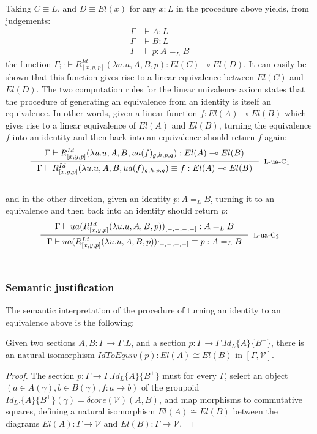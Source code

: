     Taking $C \equiv L$, and $D \equiv El(x)$ for any $x : L$ in the procedure above yields, from judgements:
    \[
      \begin{split}
        \Gamma &\vdash A : L\\
        \Gamma &\vdash B : L\\
        \Gamma &\vdash p : A =_L B
      \end{split}
    \]
    the function $\Gamma; \cdot \vdash R^{Id}_{[x, y, p]}(\lambda u.u, A, B, p) : El(C) \multimap El(D)$.
    It can easily be shown that this function gives rise to a linear equivalence between $El(C)$ and $El(D)$.
    The two computation rules for the linear univalence axiom states that the procedure of generating an equivalence from an identity is itself an equivalence. In other words, given a linear function $f : El(A) \multimap El(B)$ which gives rise to a linear equivalence of $El(A)$ and $El(B)$, turning the equivalence $f$ into an identity and then back into an equivalence should return $f$ again:
  \[
    \inference{
      \Gamma \vdash R^{Id}_{[x, y, p]}(\lambda u.u, A, B, ua(f)_{g, h, p, q}) : El(A) \multimap El(B)}
    {\Gamma \vdash R^{Id}_{[x, y, p]}(\lambda u.u, A, B, ua(f)_{g, h, p, q}) \equiv f : El(A) \multimap El(B)}
    [L-ua-C$_1$]
  \]\\
  and in the other direction, given an identity $p : A =_L B$, turning it to an equivalence and then back into an identity should return $p$:
    \[
    \inference{
      \Gamma \vdash ua(R^{Id}_{[x, y, p]}(\lambda u.u, A, B, p))_{[-,-,-,-]} : A =_L B}
    {\Gamma \vdash ua(R^{Id}_{[x, y, p]}(\lambda u.u, A, B, p))_{[-,-,-,-]} \equiv p : A =_L B}
    [L-ua-C$_2$]
  \]\\
  \subsubsection{Semantic justification}
  The semantic interpretation of the procedure of turning an identity to an equivalence above is the following:
  \begin{lemm}Given two sections $A, B : \Gamma \to \Gamma.L$, and a section $p : \Gamma \to \Gamma.Id_L\{A\}\{B^+\}$, there is an natural isomorphism $IdToEquiv(p) : El(A) \cong El(B)$ in $[\Gamma, \mathcal{V}]$.
    \begin{proof}The section $p : \Gamma \to \Gamma.Id_L\{A\}\{B^+\}$ must for every $\Gamma$, select an object $(a \in A(\gamma), b \in B(\gamma), f : a \to b)$ of the groupoid $Id_L.\{A\}\{B^+\}(\gamma) = \delta core(\mathcal{V})(A,B)$, and map morphisms to commutative squares, defining a natural isomorphism $El(A) \cong El(B)$ between the diagrams $El(A) : \Gamma \to \mathcal{V}$ and $El(B) : \Gamma \to \mathcal{V}$.
    \end{proof}
  \end{lemm}
 
